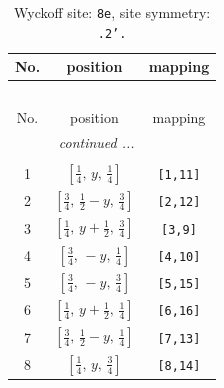 \documentclass[fleqn,8pt]{jsarticle}
\begin{document}
\begin{longtable}{ccc}
\caption{Wyckoff site: {\tt 8e}, site symmetry: {\tt .2'.}}
 \\
 \hline \hline
No. & position & mapping \\ \hline \endfirsthead

\multicolumn{2}{l}{\tablename\ \thetable{}} \\
 \hline \hline
No. & position & mapping \\ \hline \endhead

 \hline \hline
\multicolumn{2}{r}{\footnotesize\it continued ...} \\ \endfoot

 \hline \hline
\multicolumn{2}{r}{} \\ \endlastfoot

1 & $\left[ \frac{1}{4},\, y,\, \frac{1}{4} \right]$ & {\tt [1,11]} \\ \hline
2 & $\left[ \frac{3}{4},\, \frac{1}{2} - y,\, \frac{3}{4} \right]$ & {\tt [2,12]} \\ \hline
3 & $\left[ \frac{1}{4},\, y + \frac{1}{2},\, \frac{3}{4} \right]$ & {\tt [3,9]} \\ \hline
4 & $\left[ \frac{3}{4},\, - y,\, \frac{1}{4} \right]$ & {\tt [4,10]} \\ \hline
5 & $\left[ \frac{3}{4},\, - y,\, \frac{3}{4} \right]$ & {\tt [5,15]} \\ \hline
6 & $\left[ \frac{1}{4},\, y + \frac{1}{2},\, \frac{1}{4} \right]$ & {\tt [6,16]} \\ \hline
7 & $\left[ \frac{3}{4},\, \frac{1}{2} - y,\, \frac{1}{4} \right]$ & {\tt [7,13]} \\ \hline
8 & $\left[ \frac{1}{4},\, y,\, \frac{3}{4} \right]$ & {\tt [8,14]} \\
\end{longtable}
\renewcommand{\arraystretch}{1.2}
\end{document}
